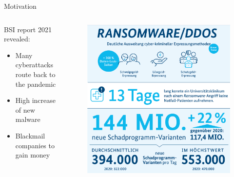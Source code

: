 \begin{frame}{Motivation}
    \begin{columns}[T]
        \begin{column}{0.5\textwidth}
            BSI report 2021 revealed:
            \begin{itemize}
                \item Many cyberattacks route back to the pandemic
                \item High increase of new malware
                \item Blackmail companies to gain money
            \end{itemize}
        \end{column}
        \begin{column}{0.5\textwidth}
            \begin{figure}
                \centering
                \includegraphics[width=\columnwidth]{img/bsi-report.png}
                \caption{\cite{bsi2021}}
            \end{figure}
        \end{column}
    \end{columns}
\end{frame}

